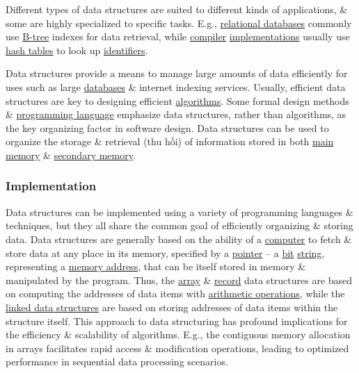 \documentclass{article}
\begin{document}
Different types of data structures are suited to different kinds of applications, \& some are highly specialized to specific tasks. E.g., \href{https://en.wikipedia.org/wiki/Relational_database}{relational databases} commonly use \href{https://en.wikipedia.org/wiki/B-tree}{B-tree} indexes for data retrieval, while \href{https://en.wikipedia.org/wiki/Compiler}{compiler} \href{https://en.wikipedia.org/wiki/Implementation}{implementations} usually use \href{https://en.wikipedia.org/wiki/Hash_table}{hash tables} to look up \href{https://en.wikipedia.org/wiki/Identifier_(computer_languages)}{identifiers}.

Data structures provide a means to manage large amounts of data efficiently for uses such as large \href{https://en.wikipedia.org/wiki/Database}{databases} \& internet indexing services. Usually, efficient data structures are key to designing efficient \href{https://en.wikipedia.org/wiki/Algorithm}{algorithms}. Some formal design methods \& \href{https://en.wikipedia.org/wiki/Programming_language}{programming language} emphasize data structures, rather than algorithms, as the key organizing factor in software design. Data structures can be used to organize the storage \& retrieval (thu hồi) of information stored in both \href{https://en.wikipedia.org/wiki/Main_memory}{main memory} \& \href{https://en.wikipedia.org/wiki/Computer_data_storage}{secondary memory}.

\subsubsection{Implementation}
Data structures can be implemented using a variety of programming languages \& techniques, but they all share the common goal of efficiently organizing \& storing data. Data structures are generally based on the ability of a \href{https://en.wikipedia.org/wiki/Computer}{computer} to fetch \& store data at any place in its memory, specified by a \href{https://en.wikipedia.org/wiki/Pointer_(computer_programming)}{pointer} -- a \href{https://en.wikipedia.org/wiki/Bit}{bit} \href{https://en.wikipedia.org/wiki/String_(computer_science)}{string}, representing a \href{https://en.wikipedia.org/wiki/Memory_address}{memory address}, that can be itself stored in memory \& manipulated by the program. Thus, the \href{https://en.wikipedia.org/wiki/Array_data_structure}{array} \& \href{https://en.wikipedia.org/wiki/Record_(computer_science)}{record} data structures are based on computing the addresses of data items with \href{https://en.wikipedia.org/wiki/Arithmetic_operations}{arithmetic operations}, while the \href{https://en.wikipedia.org/wiki/Linked_data_structure}{linked data structures} are based on storing addresses of data items within the structure itself. This approach to data structuring has profound implications for the efficiency \& scalability of algorithms. E.g., the contiguous memory allocation in arrays facilitates rapid access \& modification operations, leading to optimized performance in sequential data processing scenarios.
\end{document}
